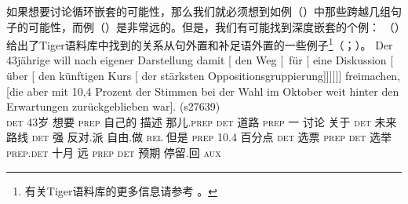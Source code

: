 如果想要讨论循环嵌套的可能性，那么我们就必须想到如例（）中那些跨越几组句子的可能性，而例（）是非常远的。但是，我们有可能找到深度嵌套的个例：
（）给出了Tiger语料库中找到的关系从句外置和补足语外置的一些例子\footnote{%
有关Tiger语料库的更多信息请参考 。
}（\citealp[--79]{Mueller2007c}；\citealp[\S~2.1]{MM2009a}）。
\eal
\ex 
\gll Der 43jährige will nach eigener Darstellung damit [ den Weg [~für [ eine
  Diskussion [ über [ den künftigen Kurs [ der stärksten
  Oppositions\-gruppierung]]]]]] freimachen, [die aber mit 10,4 Prozent
  der Stimmen bei der Wahl im Oktober weit hinter den Erwartungen zurückgeblieben war]. (s27639)\\
  \textsc{det} 43岁 想要 \textsc{prep} 自己的 描述 那儿.\textsc{prep} {} \textsc{det} 道路 \hspaceThis{[\sub{PP}~}\textsc{prep} {} 一 讨论 {} 关于 {} \textsc{det} 未来 路线 {} \textsc{det} 强
  反对.派 自由.做 \spacebr{}\textsc{rel} 但是 \textsc{prep} 10.4 百分点
  \textsc{det} 选票 \textsc{prep} \textsc{det} 选举 \textsc{prep}.\textsc{det} 十月 远 \textsc{prep} \textsc{det} 预期 停留.回 \textsc{aux}\\
